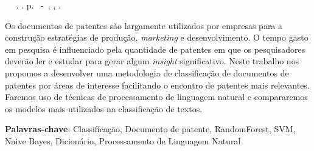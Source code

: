 \setlength{\absparsep}{18pt} %
\begin{resumo}
	\begin{flushleft} 
			\setlength{\absparsep}{0pt} %
			\SingleSpacing 
			\imprimirautorabr~ ~\textbf{\imprimirtitulo}.	\imprimirdata. \pageref{LastPage}p. 
			\imprimirtipotrabalho~-~\imprimirinstituicao, \imprimirlocal, \imprimirdata. 
 	\end{flushleft}
\OnehalfSpacing 			
Os documentos de patentes são largamente utilizados por empresas para a construção estratégias de produção, \textit{marketing} e desenvolvimento. O tempo gasto em pesquisa é influenciado pela quantidade de patentes em que os pesquisadores deverão ler e estudar para gerar algum \textit{insight} significativo. Neste trabalho nos propomos a desenvolver uma metodologia de classificação de documentos de patentes por áreas de interesse facilitando o encontro de patentes mais relevantes. Faremos uso de técnicas de processamento de linguagem natural e compararemos os modelos mais utilizados na classificação de textos.
 

 \textbf{Palavras-chave}: Classificação, Documento de patente, RandomForest, SVM, Naive Bayes, Dicionário, Processamento de Linguagem Natural
\end{resumo}